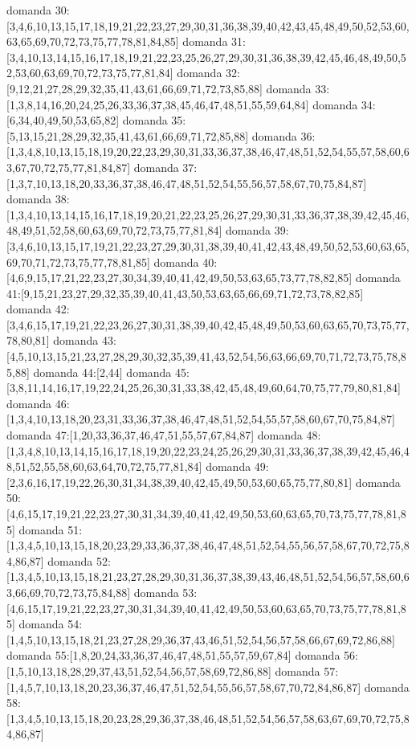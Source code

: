 domanda 30:[3,4,6,10,13,15,17,18,19,21,22,23,27,29,30,31,36,38,39,40,42,43,45,48,49,50,52,53,60,63,65,69,70,72,73,75,77,78,81,84,85]
domanda 31:[3,4,10,13,14,15,16,17,18,19,21,22,23,25,26,27,29,30,31,36,38,39,42,45,46,48,49,50,52,53,60,63,69,70,72,73,75,77,81,84]
domanda 32:[9,12,21,27,28,29,32,35,41,43,61,66,69,71,72,73,85,88]
domanda 33:[1,3,8,14,16,20,24,25,26,33,36,37,38,45,46,47,48,51,55,59,64,84]
domanda 34:[6,34,40,49,50,53,65,82]
domanda 35:[5,13,15,21,28,29,32,35,41,43,61,66,69,71,72,85,88]
domanda 36:[1,3,4,8,10,13,15,18,19,20,22,23,29,30,31,33,36,37,38,46,47,48,51,52,54,55,57,58,60,63,67,70,72,75,77,81,84,87]
domanda 37:[1,3,7,10,13,18,20,33,36,37,38,46,47,48,51,52,54,55,56,57,58,67,70,75,84,87]
domanda 38:[1,3,4,10,13,14,15,16,17,18,19,20,21,22,23,25,26,27,29,30,31,33,36,37,38,39,42,45,46,48,49,51,52,58,60,63,69,70,72,73,75,77,81,84]
domanda 39:[3,4,6,10,13,15,17,19,21,22,23,27,29,30,31,38,39,40,41,42,43,48,49,50,52,53,60,63,65,69,70,71,72,73,75,77,78,81,85]
domanda 40:[4,6,9,15,17,21,22,23,27,30,34,39,40,41,42,49,50,53,63,65,73,77,78,82,85]
domanda 41:[9,15,21,23,27,29,32,35,39,40,41,43,50,53,63,65,66,69,71,72,73,78,82,85]
domanda 42:[3,4,6,15,17,19,21,22,23,26,27,30,31,38,39,40,42,45,48,49,50,53,60,63,65,70,73,75,77,78,80,81]
domanda 43:[4,5,10,13,15,21,23,27,28,29,30,32,35,39,41,43,52,54,56,63,66,69,70,71,72,73,75,78,85,88]
domanda 44:[2,44]
domanda 45:[3,8,11,14,16,17,19,22,24,25,26,30,31,33,38,42,45,48,49,60,64,70,75,77,79,80,81,84]
domanda 46:[1,3,4,10,13,18,20,23,31,33,36,37,38,46,47,48,51,52,54,55,57,58,60,67,70,75,84,87]
domanda 47:[1,20,33,36,37,46,47,51,55,57,67,84,87]
domanda 48:[1,3,4,8,10,13,14,15,16,17,18,19,20,22,23,24,25,26,29,30,31,33,36,37,38,39,42,45,46,48,51,52,55,58,60,63,64,70,72,75,77,81,84]
domanda 49:[2,3,6,16,17,19,22,26,30,31,34,38,39,40,42,45,49,50,53,60,65,75,77,80,81]
domanda 50:[4,6,15,17,19,21,22,23,27,30,31,34,39,40,41,42,49,50,53,60,63,65,70,73,75,77,78,81,85]
domanda 51:[1,3,4,5,10,13,15,18,20,23,29,33,36,37,38,46,47,48,51,52,54,55,56,57,58,67,70,72,75,84,86,87]
domanda 52:[1,3,4,5,10,13,15,18,21,23,27,28,29,30,31,36,37,38,39,43,46,48,51,52,54,56,57,58,60,63,66,69,70,72,73,75,84,88]
domanda 53:[4,6,15,17,19,21,22,23,27,30,31,34,39,40,41,42,49,50,53,60,63,65,70,73,75,77,78,81,85]
domanda 54:[1,4,5,10,13,15,18,21,23,27,28,29,36,37,43,46,51,52,54,56,57,58,66,67,69,72,86,88]
domanda 55:[1,8,20,24,33,36,37,46,47,48,51,55,57,59,67,84]
domanda 56:[1,5,10,13,18,28,29,37,43,51,52,54,56,57,58,69,72,86,88]
domanda 57:[1,4,5,7,10,13,18,20,23,36,37,46,47,51,52,54,55,56,57,58,67,70,72,84,86,87]
domanda 58:[1,3,4,5,10,13,15,18,20,23,28,29,36,37,38,46,48,51,52,54,56,57,58,63,67,69,70,72,75,84,86,87]
